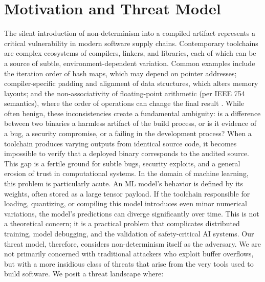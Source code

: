 \documentclass[sigconf, 10pt]{acmart}
\begin{document}
\section{Motivation and Threat Model}
The silent introduction of non-determinism into a compiled artifact represents a critical vulnerability in modern software supply chains. Contemporary toolchains are complex ecosystems of compilers, linkers, and libraries, each of which can be a source of subtle, environment-dependent variation. Common examples include the iteration order of hash maps, which may depend on pointer addresses; compiler-specific padding and alignment of data structures, which alters memory layouts; and the non-associativity of floating-point arithmetic (per IEEE 754 semantics), where the order of operations can change the final result \cite{ieee754}. While often benign, these inconsistencies create a fundamental ambiguity: is a difference between two binaries a harmless artifact of the build process, or is it evidence of a bug, a security compromise, or a failing in the development process?
When a toolchain produces varying outputs from identical source code, it becomes impossible to verify that a deployed binary corresponds to the audited source. This gap is a fertile ground for subtle bugs, security exploits, and a general erosion of trust in computational systems. In the domain of machine learning, this problem is particularly acute. An ML model's behavior is defined by its weights, often stored as a large tensor payload. If the toolchain responsible for loading, quantizing, or compiling this model introduces even minor numerical variations, the model's predictions can diverge significantly over time. This is not a theoretical concern; it is a practical problem that complicates distributed training, model debugging, and the validation of safety-critical AI systems.
Our threat model, therefore, considers non-determinism itself as the adversary. We are not primarily concerned with traditional attackers who exploit buffer overflows, but with a more insidious class of threats that arise from the very tools used to build software. We posit a threat landscape where:
\end{document}
